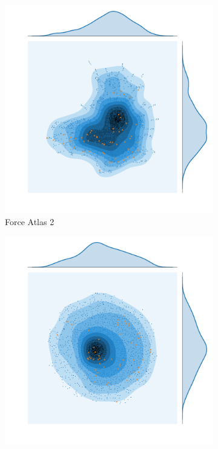 \begin{figure}[H]
\begin{subfigure}[b]{.49\textwidth}
         \centering \includegraphics[width=\textwidth,angle=0]{figures_c1/layout/fa_aphh.pdf}
         \caption{Force Atlas 2}
         \label{fig:fa}
     \end{subfigure}
    \begin{subfigure}[b]{.49\textwidth}
         \centering \includegraphics[width=\textwidth,angle=-180]{figures_c1/layout/oo_aphh.pdf}

\end{subfigure}
\end{figure}
